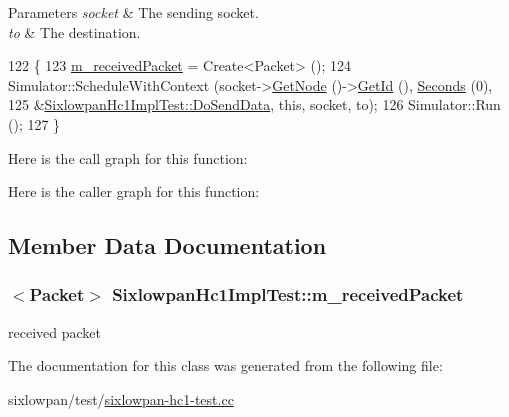 \begin{DoxyParams}{Parameters}
{\em socket} & The sending socket. \\
\hline
{\em to} & The destination. \\
\hline
\end{DoxyParams}

\begin{DoxyCode}
122 \{
123   \hyperlink{classSixlowpanHc1ImplTest_af5bac1362846db4b9764c7fcb9a84178}{m\_receivedPacket} = Create<Packet> ();
124   Simulator::ScheduleWithContext (socket->\hyperlink{classns3_1_1Socket_aba642ad4301c1df47befc0aa9afa2e48}{GetNode} ()->\hyperlink{classns3_1_1Node_aaf49b64a843565ce3812326313b370ac}{GetId} (), 
      \hyperlink{group__timecivil_ga33c34b816f8ff6628e33d5c8e9713b9e}{Seconds} (0),
125                                   &\hyperlink{classSixlowpanHc1ImplTest_adf652da71799c3e4c09e9d084c7317db}{SixlowpanHc1ImplTest::DoSendData}, \textcolor{keyword}{this}, 
      socket, to);
126   Simulator::Run ();
127 \}
\end{DoxyCode}


Here is the call graph for this function\+:




Here is the caller graph for this function\+:




\subsection{Member Data Documentation}
\subsubsection[{\texorpdfstring{m\+\_\+received\+Packet}{m_receivedPacket}}]{$<${\bf Packet}$>$ Sixlowpan\+Hc1\+Impl\+Test\+::m\+\_\+received\+Packet\hspace{0.3cm}{\ttfamily [private]}}\hypertarget{classSixlowpanHc1ImplTest_af5bac1362846db4b9764c7fcb9a84178}{}\label{classSixlowpanHc1ImplTest_af5bac1362846db4b9764c7fcb9a84178}


received packet 



The documentation for this class was generated from the following file\+:\begin{DoxyCompactItemize}
\item 
sixlowpan/test/\hyperlink{sixlowpan-hc1-test_8cc}{sixlowpan-\/hc1-\/test.\+cc}\end{DoxyCompactItemize}
